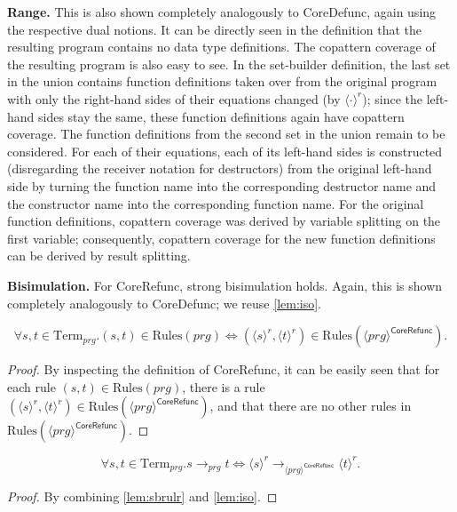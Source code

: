 \textbf{Range.} This is also shown completely analogously to \textsf{CoreDefunc}, again using the respective dual notions. It can be directly seen in the definition that the resulting program contains no data type definitions. The copattern coverage of the resulting program is also easy to see. In the set-builder definition, the last set in the union contains function definitions taken over from the original program with only the right-hand sides of their equations changed (by $\langle \cdot \rangle^r$); since the left-hand sides stay the same, these function definitions again have copattern coverage. The function definitions from the second set in the union remain to be considered. For each of their equations, each of its left-hand sides is constructed (disregarding the receiver notation for destructors) from the original left-hand side by turning the function name into the corresponding destructor name and the constructor name into the corresponding function name. For the original function definitions, copattern coverage was derived by variable splitting on the first variable; consequently, copattern coverage for the new function definitions can be derived by result splitting.

\textbf{Bisimulation.} For \textsf{CoreRefunc}, strong bisimulation holds. Again, this is shown completely analogously to \textsf{CoreDefunc}; we reuse \autoref{lem:iso}.

\begin{lemma}
\label{lem:sbrulr}
\[
\forall s,t \in \textrm{Term}_{prg}. (s, t) \in \textrm{Rules}(prg) \iff (\langle s \rangle^r, \langle t \rangle^r) \in \textrm{Rules}(\langle prg \rangle^{\textsf{CoreRefunc}}).
\]
\begin{proof}
By inspecting the definition of \textsf{CoreRefunc}, it can be easily seen that for each rule $(s, t) \in \textrm{Rules}(prg)$, there is a rule $(\langle s \rangle^r, \langle t \rangle^r) \in \textrm{Rules}(\langle prg \rangle^{\textsf{CoreRefunc}})$, and that there are no other rules in $\textrm{Rules}(\langle prg \rangle^{\textsf{CoreRefunc}})$.
\end{proof}
\end{lemma}

\begin{corollary}
\[
\forall s,t \in \textrm{Term}_{prg}. s \longrightarrow_{prg} t \iff \langle s \rangle^r \longrightarrow_{\langle prg \rangle^{\textsf{CoreRefunc}}} \langle t \rangle^r.
\]
\begin{proof}
By combining \autoref{lem:sbrulr} and \autoref{lem:iso}.
\end{proof}
\end{corollary}
